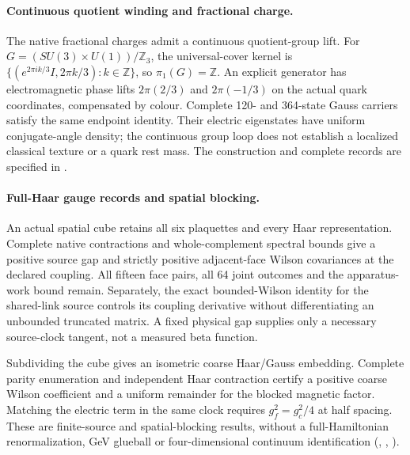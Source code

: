 \paragraph{Continuous quotient winding and fractional charge.}
The native fractional charges admit a continuous quotient-group lift.
For $G=(SU(3)\times U(1))/\mathbb Z_3$, the universal-cover kernel is
$\{(e^{2\pi i k/3}I,2\pi k/3):k\in\mathbb Z\}$, so $\pi_1(G)=\mathbb Z$.
An explicit generator has electromagnetic phase lifts $2\pi(2/3)$ and
$2\pi(-1/3)$ on the actual quark coordinates, compensated by colour.
Complete 120- and 364-state Gauss carriers satisfy the same endpoint
identity. Their electric eigenstates have uniform conjugate-angle density;
the continuous group loop does not establish a localized classical texture
or a quark rest mass.
The construction and complete records are specified in .

\paragraph{Full-Haar gauge records and spatial blocking.}
An actual spatial cube retains all six plaquettes and every Haar
representation. Complete native contractions and whole-complement
spectral bounds give a positive source gap and strictly positive
adjacent-face Wilson covariances at the declared coupling. All fifteen
face pairs, all 64 joint outcomes and the apparatus-work bound remain.
Separately, the exact bounded-Wilson identity for the shared-link source
controls its coupling derivative without differentiating an unbounded
truncated matrix. A fixed physical gap supplies only a necessary
source-clock tangent, not a measured beta function.

Subdividing the cube gives an isometric coarse Haar/Gauss embedding.
Complete parity enumeration and independent Haar contraction certify a
positive coarse Wilson coefficient and a uniform remainder for the
blocked magnetic factor. Matching the electric term in the same
clock requires $g_f^2=g_c^2/4$ at half spacing. These are finite-source and spatial-blocking
results, without a full-Hamiltonian renormalization, GeV glueball or
four-dimensional continuum identification
(,
,
).


